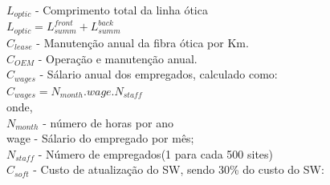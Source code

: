 \documentclass[t]{beamer}
\begin{document}
{\begin{frame}
 $L_{optic}$ - Comprimento total da linha ótica\\
 \hspace{1cm} $L_{optic}=L_{summ}^{front}+L_{summ}^{back}$\\
 $C_{lease}$ - Manutenção anual da fibra ótica por Km.\\

 $C_{OEM}$ - Operação e manutenção anual.\\
 $C_{wages}$ - Sálario anual dos empregados, calculado como:\\
 \hspace{1cm} ${C_{wages}=N_{month}.wage.N_{staff}}$\\
 \hspace{1cm} onde,\\
 \hspace{1cm} $N_{month}$ - número de horas por ano\\
 \hspace{1cm} wage - Sálario do empregado por mês;\\
\hspace{1cm}  $N_{staff}$ - Número de empregados(1 para  cada 500 sites)\\
 $C_{soft}$ - Custo de atualização do SW, sendo 30\% do custo do SW:\\
\end{frame}
 
}
\end{document}
